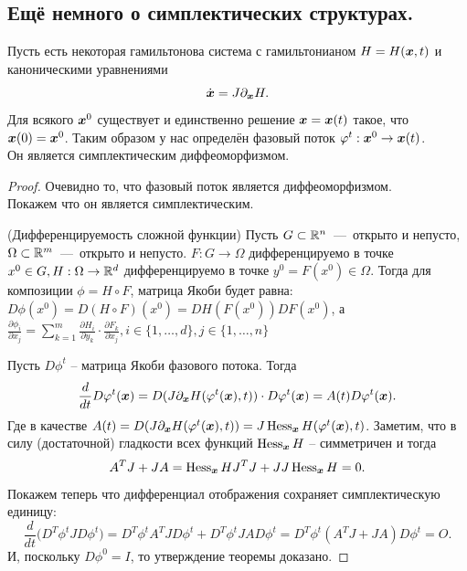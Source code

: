 \subsection{Ещё немного о симплектических структурах.}
\begin{theorem}
    Пусть есть некоторая гамильтонова система с гамильтонианом $H = H(\boldsymbol{x}, t)$ и каноническими уравнениями
    \[
        \dot{\boldsymbol{x}} = J\partial_{\boldsymbol{x}}H.
    \]
    Для всякого $\boldsymbol{x}^0$ существует и единственно решение $\boldsymbol{x} = \boldsymbol{x}(t)$ такое, что $\boldsymbol{x}(0) = \boldsymbol{x}^0$.
    Таким образом у нас определён фазовый поток $\varphi^t: \boldsymbol{x}^0 \to \boldsymbol{x}(t)$. \\
    Он является симплектическим диффеоморфизмом.
\end{theorem}
\begin{proof}
    Очевидно то, что фазовый поток является диффеоморфизмом. \\
    Покажем что он является симплектическим. \\
    \begin{reminder}{(Дифференцируемость сложной функции)}
    Пусть $G \subset \mathbb{R}^n$~---~открыто и непусто, $\Omega \subset \mathbb{R}^m$~---~открыто и непусто. $F: G \rightarrow \Omega$ дифференцируемо в точке $x^0 \in G, H: \Omega \rightarrow \mathbb{R}^d$ дифференцируемо в точке $y^0 = F(x^0) \in \Omega$. Тогда для композиции $\phi = H \circ F$, матрица Якоби будет равна: $D\phi(x^0) = D(H \circ F)(x^0) = D H(F(x^0)) D F(x^0)$, а $\frac{\partial \phi_i}{\partial x_j} = \sum \limits_{k = 1}^m \frac{\partial H_i}{\partial y_k} \cdot \frac{\partial F_k}{\partial x_j}, i \in \{1, \dots, d\}, j \in \{1, \dots, n\}$
    \end{reminder}
    Пусть $D\phi^t$ -- матрица Якоби фазового потока.
    Тогда
    \[
        \dfrac{d}{dt} D\varphi^t(\boldsymbol{x}) = D(J\partial_{\boldsymbol{x}}H(\varphi^t(\boldsymbol{x}), t)) \cdot D\varphi^t(\boldsymbol{x}) = A(t) D\varphi^t(\boldsymbol{x}).
    \]
    Где в качестве $A(t) = D(J \partial_{\boldsymbol{x}}H(\varphi^t(\boldsymbol{x}), t)) = J \operatorname{Hess}_{\boldsymbol{x}} H(\varphi^t(\boldsymbol{x}), t)$.
    Заметим, что в силу (достаточной) гладкости всех функций $\operatorname{Hess}_{\boldsymbol{x}} H$ -- симметричен и тогда
    \[
        A^{T}J + JA = \operatorname{Hess}_{\boldsymbol{x}} H J^T J + J J \operatorname{Hess}_{\boldsymbol{x}} H = 0.
    \]
    Покажем теперь что дифференциал отображения сохраняет симплектическую единицу:
    \[
        \dfrac{d}{dt}\biggr(D^T\phi^t J D\phi^t \biggr) = D^T\phi^t A^T J D\phi^t + D^T \phi^t J A D\phi^t = D^T \phi^t (A^T J + J A) D\phi^t = O.
    \]
    И, поскольку $D\phi^0 = I$, то утверждение теоремы доказано.
\end{proof}
